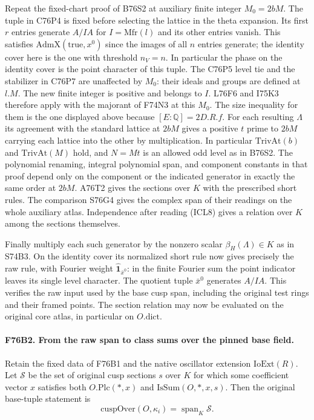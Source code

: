 Repeat the fixed-chart proof of B76S2 at auxiliary finite
integer $M_0=2bM$. The tuple in C76P4 is fixed before selecting
the lattice in the theta expansion. Its first $r$ entries generate
$A/IA$ for $I=\mathrm{Mfr}(l)$ and its other entries vanish.
This satisfies $\mathrm{AdmX}(\mathrm{true},x^0)$ since
the images of all $n$ entries generate; the identity cover here is
the one with threshold $n_V=n$. In particular the phase on the
identity cover is the point character of this tuple. The C76P5
level tie and the stabilizer in C76P7 are unaffected by $M_0$:
their ideals and groups are defined at $l.M$. The new finite
integer is positive and belongs to $I$. L76F6 and I75K3 therefore
apply with the majorant of F74N3 at this $M_0$. The size
inequality for them is the one displayed above because
$[E:\mathbb Q]=2D.R.f$. For each resulting $\Lambda$ its
agreement with the standard lattice at $2bM$ gives a positive
$t$ prime to $2bM$ carrying each lattice into the other by
multiplication. In particular $\mathrm{TrivAt}(b)$ and
$\mathrm{TrivAt}(M)$ hold, and $N=Mt$ is an allowed odd level
as in B76S2. The polynomial renaming, integral polynomial span,
and component constants in that proof depend only on the component
or the indicated generator in exactly the same order at $2bM$.
A76T2 gives the sections over $K$ with the prescribed short rules.
The comparison S76G4 gives the complex span of their readings on
the whole auxiliary atlas. Independence after reading (ICL8) gives
a relation over $K$ among the sections themselves.

Finally multiply each such generator by the nonzero scalar
$\beta_H(\Lambda)\in K$ as in S74B3. On the identity cover its
normalized short rule now gives precisely the raw rule, with
Fourier weight $\widehat{\mathbf1}_{\bar x^0}$: in the finite
Fourier sum the point indicator leaves its single level character.
The quotient tuple $\bar x^0$ generates $A/IA$. This verifies the
raw input used by the base cusp span, including the original test
rings and their framed points. The section relation may now be
evaluated on the original core atlas, in particular on $O.\mathrm{dict}$.

\paragraph{F76B2. From the raw span to class sums over the pinned base field.}
Retain the fixed data of F76B1 and the native oscillator extension
$\mathrm{IoExt}(R)$. Let $\mathcal S$ be the set of original cusp
sections $s$ over $K$ for which some coefficient vector $x$ satisfies
both $O.\mathrm{Plc}(*,x)$ and $\mathrm{IsSum}(O,*,x,s)$.
Then the original base-tuple statement is
\[
          \mathrm{cuspOver}(O,\kappa_i)
                       =\operatorname{span}_{K}\mathcal S .
\]

